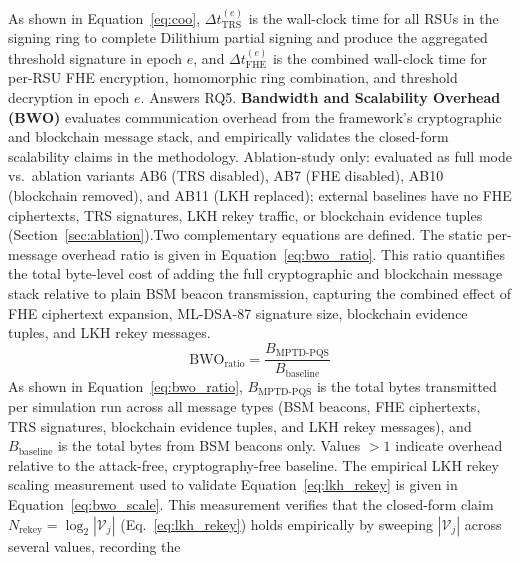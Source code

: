\documentclass[12pt, a4paper]{report}
\begin{document}
As shown in Equation~\ref{eq:coo},
$\Delta t_{\mathrm{TRS}}^{(e)}$ is the wall-clock time for all
RSUs in the signing ring to complete Dilithium partial signing
and produce the aggregated threshold signature in epoch $e$, and
$\Delta t_{\mathrm{FHE}}^{(e)}$ is the combined wall-clock time
for per-RSU FHE encryption, homomorphic ring combination, and
threshold decryption in epoch $e$. Answers RQ5.
\newline
\newline
\textbf{Bandwidth and Scalability Overhead (BWO)} evaluates
communication overhead from the framework's cryptographic and
blockchain message stack, and empirically validates the closed-form
scalability claims in the methodology. Ablation-study only: evaluated as full mode
vs.\ ablation variants AB6 (TRS disabled), AB7 (FHE disabled),
AB10 (blockchain removed), and AB11 (LKH replaced);
external baselines have no FHE ciphertexts, TRS signatures, LKH
rekey traffic, or blockchain evidence tuples
(Section~\ref{sec:ablation}).Two complementary
equations are defined. The static per-message overhead ratio
is given in Equation~\ref{eq:bwo_ratio}.
\newline
\newline
This ratio quantifies the total byte-level cost of adding the
full cryptographic and blockchain message stack relative to
plain BSM beacon transmission, capturing the combined effect
of FHE ciphertext expansion, ML-DSA-87 signature size,
blockchain evidence tuples, and LKH rekey messages.
\begin{equation}
  \mathrm{BWO}_{\mathrm{ratio}} =
    \frac{B_{\mathrm{MPTD\text{-}PQS}}}{B_{\mathrm{baseline}}}
  \label{eq:bwo_ratio}
\end{equation}
As shown in Equation~\ref{eq:bwo_ratio},
$B_{\mathrm{MPTD\text{-}PQS}}$ is the total bytes transmitted
per simulation run across all message types (BSM beacons, FHE
ciphertexts, TRS signatures, blockchain evidence tuples, and
LKH rekey messages), and $B_{\mathrm{baseline}}$ is the total
bytes from BSM beacons only. Values $> 1$ indicate overhead
relative to the attack-free, cryptography-free baseline.
The empirical LKH rekey scaling measurement used to validate
Equation~\ref{eq:lkh_rekey} is given in
Equation~\ref{eq:bwo_scale}.
\newline
\newline
This measurement verifies that the closed-form claim
$N_{\mathrm{rekey}} = \log_2|\mathcal{V}_j|$
(Eq.~\ref{eq:lkh_rekey}) holds empirically by sweeping
$|\mathcal{V}_j|$ across several values, recording the
\end{document}

